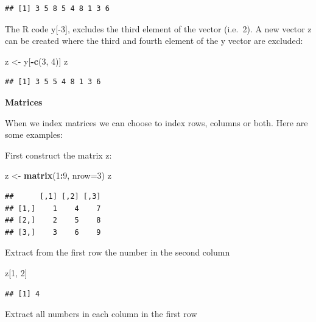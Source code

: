 \documentclass[]{book}
\newenvironment{Shaded}{\begin{snugshade}}{\end{snugshade}}
\newcommand{\KeywordTok}[1]{\textcolor[rgb]{0.13,0.29,0.53}{\textbf{#1}}}
\newcommand{\DataTypeTok}[1]{\textcolor[rgb]{0.13,0.29,0.53}{#1}}
\newcommand{\DecValTok}[1]{\textcolor[rgb]{0.00,0.00,0.81}{#1}}
\newcommand{\StringTok}[1]{\textcolor[rgb]{0.31,0.60,0.02}{#1}}
\newcommand{\OperatorTok}[1]{\textcolor[rgb]{0.81,0.36,0.00}{\textbf{#1}}}
\newcommand{\NormalTok}[1]{#1}
\begin{document}
\begin{verbatim}
## [1] 3 5 8 5 4 8 1 3 6
\end{verbatim}

The R code y{[}-3{]}, excludes the third element of the vector (i.e.~2).
A new vector z can be created where the third and fourth element of the
y vector are excluded:

\begin{Shaded}
\begin{Highlighting}[]
\NormalTok{z <-}\StringTok{ }\NormalTok{y[}\OperatorTok{-}\KeywordTok{c}\NormalTok{(}\DecValTok{3}\NormalTok{, }\DecValTok{4}\NormalTok{)]}
\NormalTok{z}
\end{Highlighting}
\end{Shaded}

\begin{verbatim}
## [1] 3 5 5 4 8 1 3 6
\end{verbatim}

\textbf{Matrices}

When we index matrices we can choose to index rows, columns or both.
Here are some examples:

First construct the matrix z:

\begin{Shaded}
\begin{Highlighting}[]
\NormalTok{z <-}\StringTok{ }\KeywordTok{matrix}\NormalTok{(}\DecValTok{1}\OperatorTok{:}\DecValTok{9}\NormalTok{, }\DataTypeTok{nrow=}\DecValTok{3}\NormalTok{)}
\NormalTok{z}
\end{Highlighting}
\end{Shaded}

\begin{verbatim}
##      [,1] [,2] [,3]
## [1,]    1    4    7
## [2,]    2    5    8
## [3,]    3    6    9
\end{verbatim}

Extract from the first row the number in the second column

\begin{Shaded}
\begin{Highlighting}[]
\NormalTok{z[}\DecValTok{1}\NormalTok{, }\DecValTok{2}\NormalTok{]}
\end{Highlighting}
\end{Shaded}

\begin{verbatim}
## [1] 4
\end{verbatim}

Extract all numbers in each column in the first row
\end{document}
